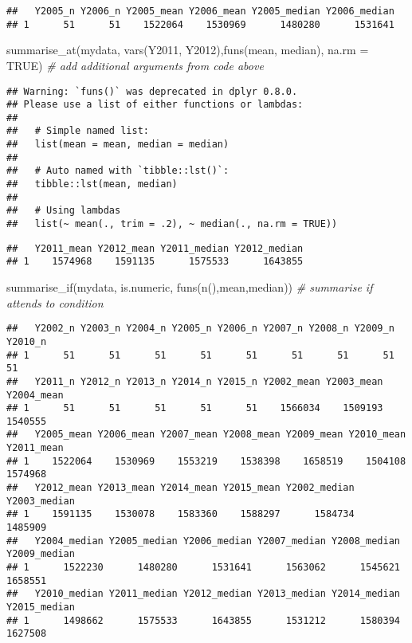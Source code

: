 \documentclass[
]{article}
\newenvironment{Shaded}{\begin{snugshade}}{\end{snugshade}}
\newcommand{\AttributeTok}[1]{\textcolor[rgb]{0.77,0.63,0.00}{#1}}
\newcommand{\CommentTok}[1]{\textcolor[rgb]{0.56,0.35,0.01}{\textit{#1}}}
\newcommand{\ConstantTok}[1]{\textcolor[rgb]{0.00,0.00,0.00}{#1}}
\newcommand{\FunctionTok}[1]{\textcolor[rgb]{0.00,0.00,0.00}{#1}}
\newcommand{\NormalTok}[1]{#1}
\begin{document}
\begin{verbatim}
##   Y2005_n Y2006_n Y2005_mean Y2006_mean Y2005_median Y2006_median
## 1      51      51    1522064    1530969      1480280      1531641
\end{verbatim}

\begin{Shaded}
\begin{Highlighting}[]
\FunctionTok{summarise\_at}\NormalTok{(mydata, }\FunctionTok{vars}\NormalTok{(Y2011, Y2012),}\FunctionTok{funs}\NormalTok{(mean, median), }\AttributeTok{na.rm =} \ConstantTok{TRUE}\NormalTok{) }\CommentTok{\# add additional arguments from code above}
\end{Highlighting}
\end{Shaded}

\begin{verbatim}
## Warning: `funs()` was deprecated in dplyr 0.8.0.
## Please use a list of either functions or lambdas: 
## 
##   # Simple named list: 
##   list(mean = mean, median = median)
## 
##   # Auto named with `tibble::lst()`: 
##   tibble::lst(mean, median)
## 
##   # Using lambdas
##   list(~ mean(., trim = .2), ~ median(., na.rm = TRUE))
\end{verbatim}

\begin{verbatim}
##   Y2011_mean Y2012_mean Y2011_median Y2012_median
## 1    1574968    1591135      1575533      1643855
\end{verbatim}

\begin{Shaded}
\begin{Highlighting}[]
\FunctionTok{summarise\_if}\NormalTok{(mydata, is.numeric, }\FunctionTok{funs}\NormalTok{(}\FunctionTok{n}\NormalTok{(),mean,median)) }\CommentTok{\# summarise if attends to condition}
\end{Highlighting}
\end{Shaded}

\begin{verbatim}
##   Y2002_n Y2003_n Y2004_n Y2005_n Y2006_n Y2007_n Y2008_n Y2009_n Y2010_n
## 1      51      51      51      51      51      51      51      51      51
##   Y2011_n Y2012_n Y2013_n Y2014_n Y2015_n Y2002_mean Y2003_mean Y2004_mean
## 1      51      51      51      51      51    1566034    1509193    1540555
##   Y2005_mean Y2006_mean Y2007_mean Y2008_mean Y2009_mean Y2010_mean Y2011_mean
## 1    1522064    1530969    1553219    1538398    1658519    1504108    1574968
##   Y2012_mean Y2013_mean Y2014_mean Y2015_mean Y2002_median Y2003_median
## 1    1591135    1530078    1583360    1588297      1584734      1485909
##   Y2004_median Y2005_median Y2006_median Y2007_median Y2008_median Y2009_median
## 1      1522230      1480280      1531641      1563062      1545621      1658551
##   Y2010_median Y2011_median Y2012_median Y2013_median Y2014_median Y2015_median
## 1      1498662      1575533      1643855      1531212      1580394      1627508
\end{verbatim}
\end{document}
